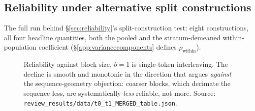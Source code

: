 \documentclass{article}
\begin{document}
\subsection{Reliability under alternative split constructions}
\label{app:splitconstruction}

The full run behind \S\ref{sec:reliability}'s split-construction test: eight
constructions, all four headline quantities, both the pooled and the
stratum-demeaned within-population coefficient (\S\ref{app:variancecomponents}
defines $\rho_{\text{within}}$).

\begin{figure}[h]
\centering

\caption{Reliability against block size, $b=1$ is single-token interleaving.
The decline is smooth and monotonic in the direction that argues
\emph{against} the sequence-geometry objection: coarser blocks, which decimate
the sequence less, are systematically \emph{less} reliable, not more.
Source: \texttt{review\_results/data/t0\_t1\_MERGED\_table.json}.}
\label{fig:splitconstruction}
\end{figure}
\end{document}
